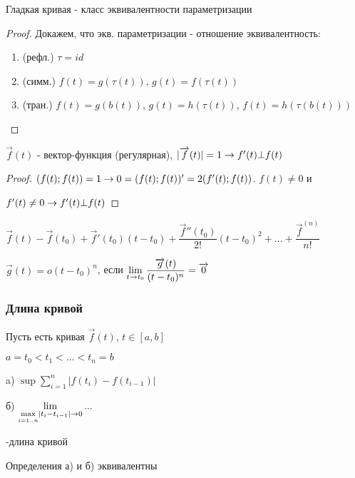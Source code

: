 \documentclass[12pt, fleqn]{article}
\begin{document}
\begin{definition}
    Гладкая кривая - класс эквивалентности параметризации
\end{definition}

\begin{proof}
    Докажем, что экв. параметризации - отношение эквивалентность:
    \begin{enumerate}
        \item (рефл.) $\tau=id$
        \item (симм.) $f(t)=g(\tau(t))$, $g(t)=f(\tau(t))$
        \item (тран.) $f(t)=g(b(t))$, $g(t)=h(\tau(t))$, $f(t)=h(\tau(b(t)))$
    \end{enumerate}
\end{proof}

\begin{lemma}
    $\overrightarrow{f}(t)$ - вектор-функция (регулярная), $|\overrightarrow{f}(t)|=1 \rightarrow f'(t) \bot f(t)$
\end{lemma}

\begin{proof}
    $(f(t);f(t))=1 \rightarrow 0=(f(t);f(t))'=2(f'(t);f(t))$. $f(t) \neq 0$ и
    
    $f'(t) \neq 0 \rightarrow f'(t) \bot f(t)$
\end{proof}

\begin{theorem}
    $\vec{f}(t)-\vec{f}(t_0)+\vec{f}'(t_0)(t-t_0)+\dfrac{\vec{f}''(t_0)}{2!}(t-t_0)^2+...+\dfrac{\vec{f}^{(n)}}{n!}$
    
    $\vec{g}(t)=o(t-t_0)^n$, если $\lim\limits_{t \rightarrow t_0} \dfrac{\overrightarrow{g}(t)}{(t-t_0)^n}=\overrightarrow{0}$
\end{theorem}

\subsubsection{Длина кривой}
\begin{definition}
    Пусть есть кривая $\vec{f}(t)$, $t \in [a,b]$
    
    $a=t_0<t_1<...<t_n=b$
    
    a) $\sup \sum\limits_{i=1}^n |f(t_i)-f(t_{i-1})|$
    
    б) $\lim\limits_{\underset{i=1..n}{\max} |t_i-t_{i-1}| \rightarrow 0} ...$
    
    -длина кривой
\end{definition}

\begin{utv}
	Определения а) и б) эквивалентны
\end{utv}
\end{document}
